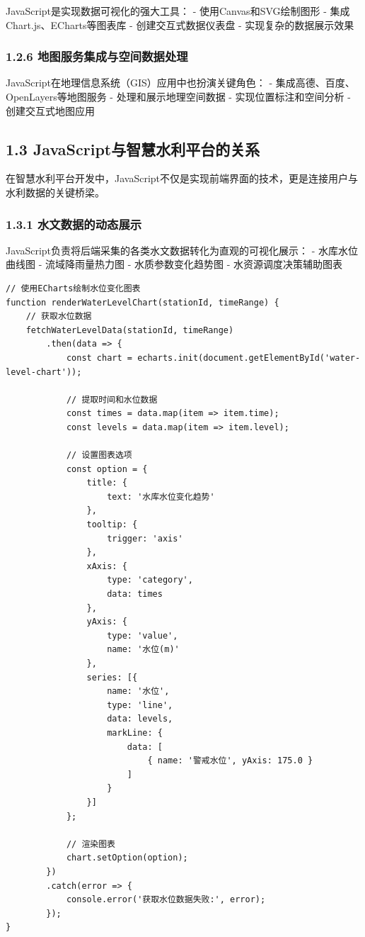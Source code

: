 JavaScript是实现数据可视化的强大工具： - 使用Canvas和SVG绘制图形 -
集成Chart.js、ECharts等图表库 - 创建交互式数据仪表盘 -
实现复杂的数据展示效果

\subsubsection{1.2.6
地图服务集成与空间数据处理}\label{ux5730ux56feux670dux52a1ux96c6ux6210ux4e0eux7a7aux95f4ux6570ux636eux5904ux7406}

JavaScript在地理信息系统（GIS）应用中也扮演关键角色： -
集成高德、百度、OpenLayers等地图服务 - 处理和展示地理空间数据 -
实现位置标注和空间分析 - 创建交互式地图应用

\subsection{1.3
JavaScript与智慧水利平台的关系}\label{javascriptux4e0eux667aux6167ux6c34ux5229ux5e73ux53f0ux7684ux5173ux7cfb}

在智慧水利平台开发中，JavaScript不仅是实现前端界面的技术，更是连接用户与水利数据的关键桥梁。

\subsubsection{1.3.1
水文数据的动态展示}\label{ux6c34ux6587ux6570ux636eux7684ux52a8ux6001ux5c55ux793a}

JavaScript负责将后端采集的各类水文数据转化为直观的可视化展示： -
水库水位曲线图 - 流域降雨量热力图 - 水质参数变化趋势图 -
水资源调度决策辅助图表

\begin{lstlisting}
// 使用ECharts绘制水位变化图表
function renderWaterLevelChart(stationId, timeRange) {
    // 获取水位数据
    fetchWaterLevelData(stationId, timeRange)
        .then(data => {
            const chart = echarts.init(document.getElementById('water-level-chart'));
            
            // 提取时间和水位数据
            const times = data.map(item => item.time);
            const levels = data.map(item => item.level);
            
            // 设置图表选项
            const option = {
                title: {
                    text: '水库水位变化趋势'
                },
                tooltip: {
                    trigger: 'axis'
                },
                xAxis: {
                    type: 'category',
                    data: times
                },
                yAxis: {
                    type: 'value',
                    name: '水位(m)'
                },
                series: [{
                    name: '水位',
                    type: 'line',
                    data: levels,
                    markLine: {
                        data: [
                            { name: '警戒水位', yAxis: 175.0 }
                        ]
                    }
                }]
            };
            
            // 渲染图表
            chart.setOption(option);
        })
        .catch(error => {
            console.error('获取水位数据失败:', error);
        });
}
\end{lstlisting}

